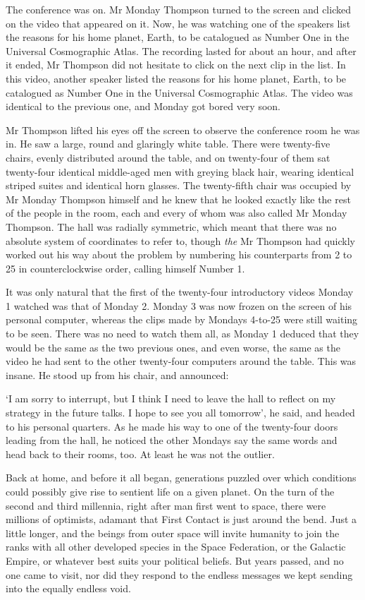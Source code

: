 ﻿The conference was on. Mr Monday Thompson turned to the screen and
clicked on the video that appeared on it. Now, he was watching one of
the speakers list the reasons for his home planet, Earth, to be
catalogued as Number One in the Universal Cosmographic Atlas. The
recording lasted for about an hour, and after it ended, Mr Thompson
did not hesitate to click on the next clip in the list. In this video,
another speaker listed the reasons for his home planet, Earth, to be
catalogued as Number One in the Universal Cosmographic Atlas. The
video was identical to the previous one, and Monday got bored very
soon.

Mr Thompson lifted his eyes off the screen to observe the conference
room he was in. He saw a large, round and glaringly white table. There
were twenty-five chairs, evenly distributed around the table, and on
twenty-four of them sat twenty-four identical middle-aged men with
greying black hair, wearing identical striped suites and identical
horn glasses. The twenty-fifth chair was occupied by Mr Monday
Thompson himself and he knew that he looked exactly like the rest of
the people in the room, each and every of whom was also called Mr
Monday Thompson. The hall was radially symmetric, which meant that
there was no absolute system of coordinates to refer to,
though \emph{the} Mr Thompson had quickly worked out his way about the
problem by numbering his counterparts from 2 to 25 in counterclockwise
order, calling himself Number 1.

It was only natural that the first of the twenty-four introductory
videos Monday 1 watched was that of Monday 2. Monday 3 was now frozen
on the screen of his personal computer, whereas the clips made by
Mondays 4-to-25 were still waiting to be seen. There was no need to
watch them all, as Monday 1 deduced that they would be the same as the
two previous ones, and even worse, the same as the video he had sent
to the other twenty-four computers around the table. This was
insane. He stood up from his chair, and announced:

`I am sorry to interrupt, but I think I need to leave the hall to
reflect on my strategy in the future talks. I hope to see you all
tomorrow', he said, and headed to his personal quarters. As he made
his way to one of the twenty-four doors leading from the hall, he
noticed the other Mondays say the same words and head back to their
rooms, too. At least he was not the outlier.

\hsep

Back at home, and before it all began, generations puzzled over which
conditions could possibly give rise to sentient life on a given
planet. On the turn of the second and third millennia, right after man
first went to space, there were millions of optimists, adamant that
First Contact is just around the bend. Just a little longer, and the
beings from outer space will invite humanity to join the ranks
with all other developed species in the Space Federation, or the
Galactic Empire, or whatever best suits your political beliefs. But
years passed, and no one came to visit, nor did they respond to the
endless messages we kept sending into the equally endless void.

